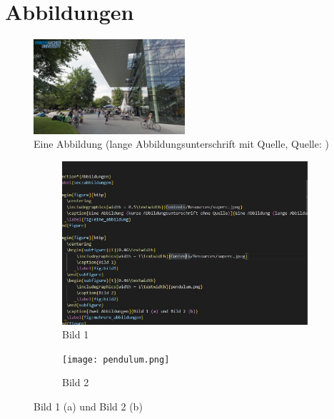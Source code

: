\section*{Abbildungen}
\label{sec:abbildungen}

\begin{figure}[htbp]
    \centering
    \includegraphics[width = 0.5\textwidth]{Contents/Resources/superc.jpeg}
    \caption[Eine Abbildung (kurze Abbildungsunterschrift ohne Quelle)]{Eine Abbildung (lange Abbildungsunterschrift mit Quelle, Quelle: \cite[1]{Mustermann.2012})}
    \label{fig:eine_abbildung}
\end{figure}

\begin{figure}[htbp]
    \centering
    \begin{subfigure}[t]{0.45\textwidth}
        \includegraphics[width = 1\textwidth]{Contents/Resources/1103.jpg}
        \caption{Bild 1}
        \label{fig:bild1}
    \end{subfigure}
    \begin{subfigure}[t]{0.46\textwidth}
        \texttt{[image: pendulum.png]}
        \caption{Bild 2}
        \label{fig:bild2}
    \end{subfigure}
    \caption[Zwei Abbildungen]{Bild 1 (a) und Bild 2 (b)}
    \label{fig:mehrere_abbildungen}
\end{figure}

